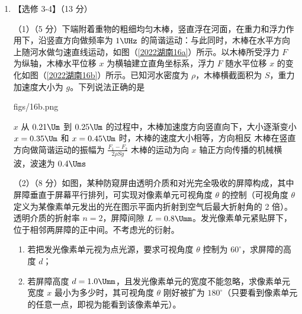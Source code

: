 \documentclass[\gkver]{gaokaozhenti}
\begin{document}
\begin{enumerate}
{②当活塞在 B 位置时，汽缸内压强为 $p_{2}$，则有

$p_{1}V_{0} = p_{2}(V_{0} + Sh)$

代入数据解得

$p_{2} = 9.9 \times 10^{4}\UPa$

将活塞与金属丝视为一整体，因平衡则有

$p_{0}S = p_{2}S + (m_{1} + m_{2})g + F$

联立解得

$F = 1\UN$。
}

\item
【选修 3-4】（13 分）

（1）（5 分）下端附着重物的粗细均匀木棒，竖直浮在河面，在重力和浮力作用下，沿竖直方向做频率为 $1\UHz$ 的简谐运动：与此同时，木棒在水平方向上随河水做匀速直线运动，如图（\ref{2022湖南16a}）所示。以木棒所受浮力 $F$ 为纵轴，木棒水平位移 $x$ 为横轴建立直角坐标系，浮力 $F$ 随水平位移 $x$ 的变化如图（\ref{2022湖南16b}）所示。已知河水密度为 $\rho$，木棒横截面积为 $S$，重力加速度大小为 $g$。下列说法正确的是

{figs/16b.png}

{$x$ 从 $0.21\Um$ 到 $0.25\Um$ 的过程中，木棒加速度方向竖直向下，大小逐渐变小}
{$x = 0.35\Um$ 和 $x = 0.45\Um$ 时，木棒的速度大小相等，方向相反}
{木棒在竖直方向做简谐运动的振幅为 $\frac{F_{1} - F_{2}}{2\rho Sg}$}
{木棒的运动为向 $x$ 轴正方向传播的机械横波，波速为 $0.4\Ums$}

（2）（8 分）如图，某种防窥屏由透明介质和对光完全吸收的屏障构成，其中屏障垂直于屏幕平行排列，可实现对像素单元可视角度 $\theta$ 的控制（可视角度 $\theta$ 定义为某像素单元发出的光在图示平面内折射到空气后最大折射角的 2 倍）。透明介质的折射率 $n = 2$，屏障间隙 $L = 0.8\Umm$。发光像素单元紧贴屏下，位于相邻两屏障的正中间。不考虑光的衍射。
\begin{enumerate}
	\item
	若把发光像素单元视为点光源，要求可视角度 $\theta$ 控制为 $60^{\circ}$，求屏障的高度 $d$；
	\item
	若屏障高度 $d = 1.0\Umm$，且发光像素单元的宽度不能忽略，求像素单元宽度 $x$ 最小为多少时，其可视角度 $\theta$ 刚好被扩为 $180^{\circ}$（只要看到像素单元的任意一点，即视为能看到该像素单元）。
\end{enumerate}


\end{enumerate}
\end{document}
